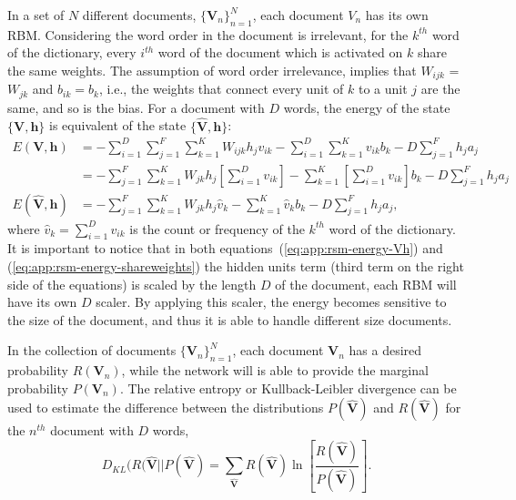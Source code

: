 In a set of $N$ different documents, $\{\mathbf{V}_{n}\}^{N}_{n=1}$, each document $V_{n}$ has its own RBM. Considering the word order in the document is irrelevant, for the $k^{th}$ word of the dictionary, every $i^{th}$ word of the document which is activated on $k$ share the same weights. The assumption of word order irrelevance, implies that $W_{ijk}$ = $W_{jk}$ and $b_{ik} = b_{k}$, i.e., the weights that connect every unit of $k$ to a unit $j$ are the same, and so is the bias. For a document with $D$ words, the energy of the state $\{\mathbf{V}, \mathbf{h}\}$ is equivalent of the state $\{\mathbf{\hat{V}}, \mathbf{h}\}$:
\begin{align}
    \label{eq:app:rsm-energy-shareweights}
     E(\mathbf{V}, \mathbf{h}) &= -\sum^{D}_{i=1} \sum^{F}_{j=1} \sum^{K}_{k=1} W_{ijk} h_{j} v_{ik} - \sum^{D}_{i=1} \sum^{K}_{k=1} v_{ik} b_{k} - D \sum^{F}_{j=1} h_{j} a_{j} \nonumber \\ %
     &= -\sum^{F}_{j=1} \sum^{K}_{k=1} W_{jk} h_{j} \left[ \sum^{D}_{i=1} v_{ik} \right] - \sum^{K}_{k=1}  \left[ \sum^{D}_{i=1 }v_{ik} \right] b_{k} - D \sum^{F}_{j=1} h_{j} a_{j} \nonumber \\ %
     E(\mathbf{\hat{V}}, \mathbf{h}) &= -\sum^{F}_{j=1} \sum^{K}_{k=1} W_{jk} h_{j} \hat{v}_{k} - \sum^{K}_{k=1} \hat{v}_{k} b_{k} - D \sum^{F}_{j=1} h_{j} a_{j}, %
\end{align}
where $\hat{v}_{k} = \sum^{D}_{i=1} v_{ik}$ is the count or frequency of the $k^{th}$ word of the dictionary. It is important to notice that in both equations~(\ref{eq:app:rsm-energy-Vh}) and (\ref{eq:app:rsm-energy-shareweights}) the hidden units term (third term on the right side of the equations) is scaled by the length $D$ of the document, each RBM will have its own $D$ scaler. By applying this scaler, the energy becomes sensitive to the size of the document, and thus it is able to handle different size documents.

In the collection of documents $\{\mathbf{V}_{n}\}^{N}_{n=1}$, each document $\mathbf{V}_{n}$ has a desired probability $R(\mathbf{V}_{n})$, while the network will is able to provide the marginal probability $P(\mathbf{V}_{n})$. The relative entropy or Kullback-Leibler divergence can be used to estimate the difference between the distributions $P(\mathbf{\hat{V}})$ and $R(\mathbf{\hat{V}})$ for the $n^{th}$ document with $D$ words,
\begin{equation}
    \label{eq:app:rsm-dkl}
    D_{KL}(R(\mathbf{\hat{V}} || P(\mathbf{\hat{V}}) = \sum_{\mathbf{\hat{V}}} R(\mathbf{\hat{V}}) \ln\left[ \frac{R(\mathbf{\hat{V}})}{P(\mathbf{\hat{V}})} \right].
\end{equation}

